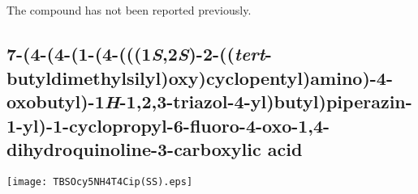 \\[1\baselineskip]
\\[1\baselineskip]
\\[1\baselineskip]
\\[1\baselineskip]
The compound has not been reported previously.

\subsection{7\hyp{}(4\hyp{}(4\hyp{}(1\hyp{}(4\hyp{}(((1\textit{S},2\textit{S})\hyp{}2\hyp{}((\textit{tert}\hyp{}butyldimethylsilyl)oxy)cyclopentyl)amino)\hyp{}4\hyp{}oxobutyl)\hyp{}1\textit{H}\hyp{}1,2,3\hyp{}triazol\hyp{}4\hyp{}yl)butyl)piperazin\hyp{}1\hyp{}yl)\hyp{}1\hyp{}cyclopropyl\hyp{}6\hyp{}fluoro\hyp{}4\hyp{}oxo\hyp{}1,4\hyp{}dihydroquinoline\hyp{}3\hyp{}carboxylic acid }


\begin{scheme}[H]
	\begin{center}
		\texttt{[image: TBSOcy5NH4T4Cip(SS).eps]}
	\end{center}
\end{scheme}

